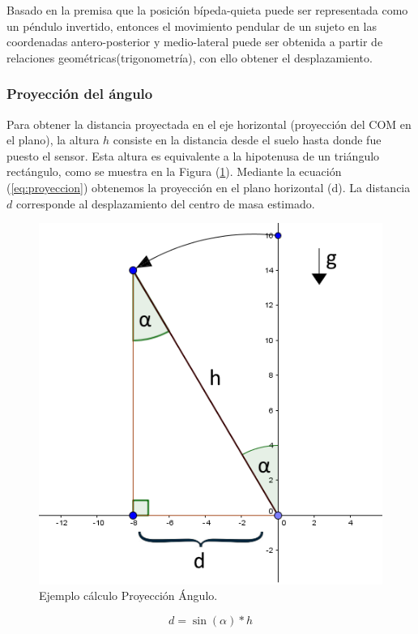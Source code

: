 \documentclass[12pt,a4paper]{article}
\begin{document}
Basado en la premisa que la posición bípeda-quieta puede ser representada como un péndulo invertido\cite{gage_kinematic_2004}, entonces el movimiento pendular de un sujeto en las coordenadas antero-posterior y medio-lateral puede ser obtenida a partir de relaciones geométricas(trigonometría), con ello obtener el desplazamiento.


\subsubsection{Proyección del ángulo}
Para obtener la distancia proyectada en el eje horizontal (proyección del COM en el plano), la altura $h$ consiste en la distancia desde el suelo hasta donde fue puesto el sensor. Esta altura es equivalente a la hipotenusa de un triángulo rectángulo, como se muestra en la Figura (\ref{fig:proyeccion}). Mediante la ecuación (\ref{eq:proyeccion}) obtenemos la proyección en el plano horizontal (d). La distancia $d$ corresponde al desplazamiento del centro de masa estimado.

\begin{figure}[H]
	\centering
	\includegraphics[scale=0.6]{images/calculoProyeccion}
	\caption{Ejemplo cálculo Proyección Ángulo.}
	\label{fig:proyeccion}
\end{figure}

\begin{equation}
	\label{eq:proyeccion}
	d=\sin(\alpha)*h
\end{equation}
\end{document}
